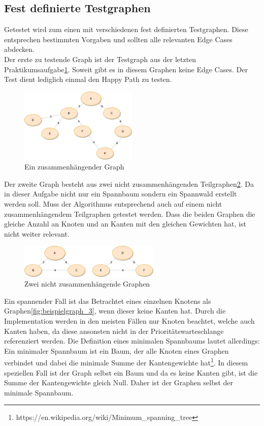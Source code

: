 \documentclass[a4paper]{article}
\begin{document}
\subsection{Fest definierte Testgraphen}

Getestet wird zum einen mit verschiedenen fest definierten Testgraphen. Diese entsprechen bestimmten Vorgaben und sollten alle relevanten Edge Cases abdecken.\\

Der erste zu testende Graph ist der Testgraph aus der letzten Praktikumsaufgabe\ref{fig:beispielgraph_4}. Soweit gibt es in diesem Graphen keine Edge Cases. Der Test dient lediglich einmal den Happy Path zu testen.

\begin{figure}[htbp]
	\centering
		\includegraphics[width=0.50\textwidth]{Latex/Figs/Beispielgraph_4.png}		
	\caption{Ein zusammenhängender Graph}
	\label{fig:beispielgraph_4}
\end{figure}

Der zweite Graph besteht aus zwei nicht zusammenhängenden Teilgraphen\ref{fig:beispielgraph_2}. Da in dieser Aufgabe nicht nur ein Spannbaum sondern ein Spannwald erstellt werden soll. Muss der Algorithmus entsprechend auch auf einem nicht zusammenhängendem Teilgraphen getestet werden. Dass die beiden Graphen die gleiche Anzahl an Knoten und an Kanten mit den gleichen Gewichten hat, ist nicht weiter relevant.

\begin{figure}[htbp]
	\centering
		\includegraphics[width=0.60\textwidth]{Latex/Figs/Beispielgraph_2.png}		
	\caption{Zwei nicht zusammenhängende Graphen}
	\label{fig:beispielgraph_2}
\end{figure}

Ein spannender Fall ist das Betrachtet eines einzelnen Knotens als Graphen\ref{fig:beispielgraph_3}, wenn dieser keine Kanten hat. Durch die Implementation werden in den meisten Fällen nur Knoten beachtet, welche auch Kanten haben, da diese ansonsten nicht in der Prioritätswarteschlange referenziert werden. Die Definition eines minimalen Spannbaums lautet allerdings: Ein minimaler Spannbaum ist ein Baum, der alle Knoten eines Graphen verbindet und dabei die minimale Summe der Kantengewichte hat\footnote{https://en.wikipedia.org/wiki/Minimum\_spanning\_tree}. In diesem speziellen Fall ist der Graph selbst ein Baum und da es keine Kanten gibt, ist die Summe der Kantengewichte gleich Null. Daher ist der Graphen selbst der minimale Spannbaum.
\end{document}
